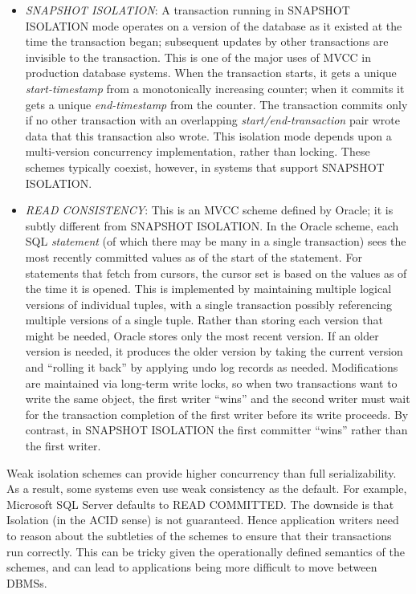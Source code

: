 \documentclass[a4paper,11pt,twoside,openright]{book}
\begin{document}
\begin{itemize}
\item
  \emph{SNAPSHOT ISOLATION}: A transaction running in SNAPSHOT
  ISOLATION mode operates on a version of the database as it existed at
  the time the transaction began; subsequent updates by other
  transactions are invisible to the transaction. This is one of the
  major uses of MVCC in production database systems. When the
  transaction starts, it gets a unique \emph{start-timestamp} from a
  monotonically increasing counter; when it commits it gets a unique
  \emph{end-timestamp} from the counter. The transaction commits only if
  no other transaction with an overlapping \emph{start/end-transaction}
  pair wrote data that this transaction also wrote. This isolation mode
  depends upon a multi-version concurrency implementation, rather than
  locking. These schemes typically coexist, however, in systems that
  support SNAPSHOT ISOLATION.
\item
  \emph{READ CONSISTENCY}: This is an MVCC scheme defined by Oracle; it
  is subtly different from SNAPSHOT ISOLATION. In the Oracle scheme,
  each SQL \emph{statement} (of which there may be many in a single
  transaction) sees the most recently committed values as of the start
  of the statement. For statements that fetch from cursors, the cursor
  set is based on the values as of the time it is opened. This is
  implemented by maintaining multiple logical versions of individual
  tuples, with a single transaction possibly referencing multiple
  versions of a single tuple. Rather than storing each version that
  might be needed, Oracle stores only the most recent version. If an
  older version is needed, it produces the older version by taking the
  current version and ``rolling it back'' by applying undo log records
  as needed. Modifications are maintained via long-term write locks, so
  when two transactions want to write the same object, the first writer
  ``wins'' and the second writer must wait for the transaction
  completion of the first writer before its write proceeds. By contrast,
  in SNAPSHOT ISOLATION the first committer ``wins'' rather than the
  first writer.
\end{itemize}

Weak isolation schemes can provide higher concurrency than full
serializability. As a result, some systems even use weak consistency as
the default. For example, Microsoft SQL Server defaults to READ
COMMITTED. The downside is that Isolation (in the ACID sense) is not
guaranteed. Hence application writers need to reason about the
subtleties of the schemes to ensure that their transactions run
correctly. This can be tricky given the operationally defined semantics
of the schemes, and can lead to applications being more difficult to
move between DBMSs.
\end{document}
